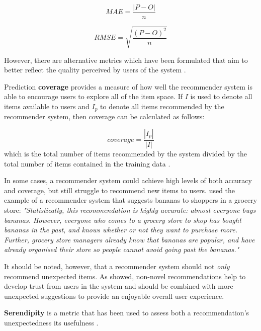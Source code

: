 \begin{equation}
    MAE = \dfrac{|P - O|}{n}
\end{equation}

\begin{equation}
    RMSE = \sqrt{\dfrac{(P - O)^{2}}{n}}
\end{equation}

However, there are alternative metrics which have been formulated that aim to better reflect the quality perceived by users of the system \parencite{eval_colab}.

Prediction \textbf{coverage} provides a measure of how well the recommender system is able to encourage users to explore all of the item space. If $I$ is used to denote all items available to users and $I_p$ to denote all items recommended by the recommender system, then coverage can be calculated as follows:

\begin{equation} \label{eqn:cov}
    coverage = \dfrac{|I_p|}{|I|}
\end{equation}
\hspace{2em} which is the total number of items recommended by the system divided by the total number of items contained in the training data \parencite{eval_coverage}.

In some cases, a recommender system could achieve high levels of both accuracy and coverage, but still struggle to recommend new items to users. \cite{eval_colab} used the example of a recommender system that suggests bananas to shoppers in a grocery store: \textit{"Statistically, this recommendation is highly accurate: almost everyone buys bananas. However, everyone who comes to a grocery store to shop has bought bananas in the past, and knows whether or not they want to purchase more. Further, grocery store managers already know that bananas are popular, and have already organised their store so people cannot avoid going past the bananas."} 

It should be noted, however, that a recommender system should not \textit{only} recommend unexpected items. As \cite{swearingen2001beyondalgorithms} showed, non-novel recommendations help to develop trust from users in the system and should be combined with more unexpected suggestions to provide an enjoyable overall user experience.

\textbf{Serendipity} is a metric that has been used to assess both a recommendation's unexpectedness  its usefulness \parencite{online_predicting}.

